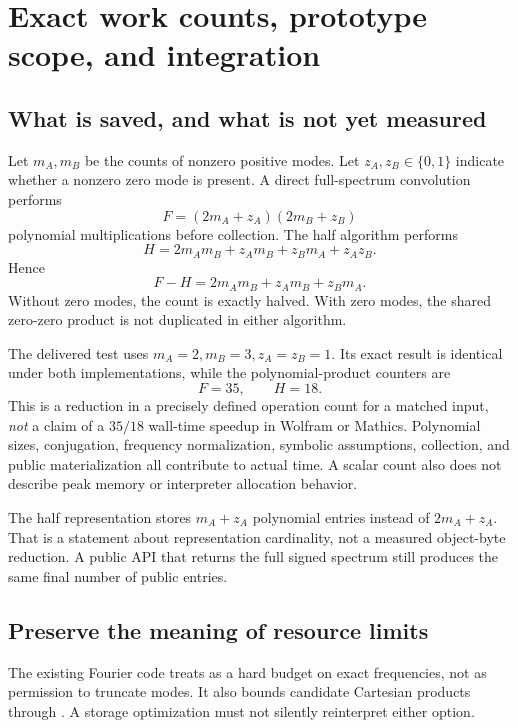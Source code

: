 \documentclass[11pt,letterpaper]{article}
\newcommand{\code}[1]{\texttt{\small\detokenize{#1}}}
\begin{document}
\section{Exact work counts, prototype scope, and integration}
\subsection{What is saved, and what is not yet measured}
Let \(m_A,m_B\) be the counts of nonzero positive modes. Let \(z_A,z_B\in\{0,1\}\) indicate whether a nonzero zero mode is present. A direct full-spectrum convolution performs
\begin{equation}\label{eq:fullcost}
 F=(2m_A+z_A)(2m_B+z_B)
\end{equation}
polynomial multiplications before collection. The half algorithm performs
\begin{equation}\label{eq:halfcost}
 H=2m_A m_B+z_A m_B+z_B m_A+z_Az_B.
\end{equation}
Hence
\[
 F-H=2m_A m_B+z_A m_B+z_B m_A.
\]
Without zero modes, the count is exactly halved. With zero modes, the shared zero-zero product is not duplicated in either algorithm.

The delivered test uses \(m_A=2,m_B=3,z_A=z_B=1\). Its exact result is identical under both implementations, while the polynomial-product counters are
\[
 F=35,\qquad H=18.
\]
This is a reduction in a precisely defined operation count for a matched input, \emph{not} a claim of a \(35/18\) wall-time speedup in Wolfram or Mathics. Polynomial sizes, conjugation, frequency normalization, symbolic assumptions, collection, and public materialization all contribute to actual time. A scalar count also does not describe peak memory or interpreter allocation behavior.

The half representation stores \(m_A+z_A\) polynomial entries instead of \(2m_A+z_A\). That is a statement about representation cardinality, not a measured object-byte reduction. A public API that returns the full signed spectrum still produces the same final number of public entries.

\subsection{Preserve the meaning of resource limits}
The existing Fourier code treats \code{MaxFrequencies} as a hard budget on exact frequencies, not as permission to truncate modes. It also bounds candidate Cartesian products through \code{MaxTerms}. A storage optimization must not silently reinterpret either option.\cite{fourier}
\end{document}
